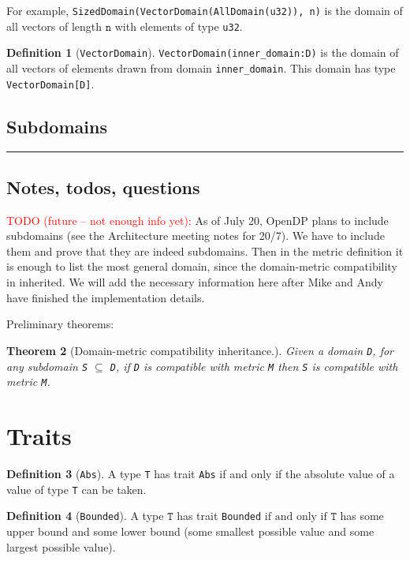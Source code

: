 \documentclass[11pt,a4paper]{article}
\newtheorem{theorem}{Theorem}[section]
\theoremstyle{definition}
\newtheorem{definition}[theorem]{Definition}
\newcommand{\horizline}{\noindent\rule{\textwidth}{1pt}}
\newcommand{\T}{\texttt{T}}
\newcommand{\todonei}{{\textcolor{red}{TODO (future -- not enough info yet): }}}
\newcommand{\iffText}{\text{if and only if}}
\newcommand{\domainType}[1]{This domain has type \texttt{#1}.}
\begin{document}
For example, \texttt{SizedDomain(VectorDomain(AllDomain(u32)), n)} is the domain of all vectors of length $\texttt{n}$ with elements of type \texttt{u32}.

\begin{definition}[\texttt{VectorDomain}]
\texttt{VectorDomain(inner\_domain:D)} is the domain of all vectors of elements drawn from domain \texttt{inner\_domain}. 
\domainType{VectorDomain[D]}
\end{definition}

\subsection{Subdomains}

\horizline

\subsection{Notes, todos, questions}

\todonei{As of July 20, OpenDP plans to include subdomains (see the Architecture meeting notes for 20/7). We have to include them and prove that they are indeed subdomains. Then in the metric definition it is enough to list the most general domain, since the domain-metric compatibility in inherited. We will add the necessary information here after Mike and Andy have finished the implementation details.}

Preliminary theorems:

\begin{theorem}[Domain-metric compatibility inheritance.]
    Given a domain \texttt{D}, for any subdomain \texttt{S} $\subseteq$ \texttt{D}, if \texttt{D} is compatible with metric \texttt{M} then \texttt{S} is compatible with metric \texttt{M}.
\end{theorem}

\section{Traits}

\begin{definition}[\texttt{Abs}]
    A type \texttt{T} has trait \texttt{Abs} if and only if the absolute value of a value of type \texttt{T} can be taken.
\end{definition}

\begin{definition}[\texttt{Bounded}]
    A type $\T$ has trait \texttt{Bounded} $\iffText$ $\T$ has some upper bound and some lower bound (some smallest possible value and some largest possible value).
\end{definition}
\end{document}
